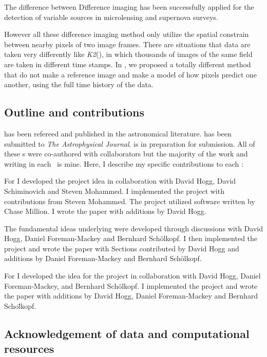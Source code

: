 \documentclass[12pt, preprint]{aastex}
\newcommand{\project}[1]{\textsl{#1}}
\newcommand{\ktwo}{\project{K2}}
\begin{document}
The difference between 
Difference imaging has been successfully applied for the detection of variable sources in microlensing \citep{macho, ogle} and supernova \citep{sdss} surveys.

However all these difference imaging method only utilize the spatial constrain between nearby pixels of two image frames.
There are situations that data are taken very differently like \ktwo(\citep{k2}), in which thousands of images of the same field are taken in different time stamps.
In , we proposed a totally different method that do not make a reference image and make a model of how pixels predict one another, using the full time history of the data.

\subsection{Outline and contributions}
 has been refereed and published in the astronomical literature.
 has been submitted to \emph{The Astrophysical Journal}.
 is in preparation for submission.
All of these \chapname s were co-authored with collaborators but the majority of the work and writing in each \chapname\ is mine.
Here, I describe my specific contributions to each \chapname:
\begin{enumerate}

{\item For   I developed the project idea in collaboration with David Hogg, David Schiminovich and Steven Mohammed.
I implemented the project with contributions from Steven Mohammed.
The project utilized software written by Chase Million.
I wrote the paper with additions by David Hogg.}

{\item The fundamental ideas underlying  were developed through discussions with David Hogg, Daniel Foreman-Mackey and Bernhard Sch\"olkopf.
I then implemented the project and wrote the paper with Sections contributed by David Hogg and additions by Daniel Foreman-Mackey and Bernhard Sch\"olkopf.}

{\item For  I developed the idea for the project in collaboration with David Hogg, Daniel Foreman-Mackey, and Bernhard Sch\"olkopf.
I implemented the project and wrote the paper with additions by David Hogg, Daniel Foreman-Mackey and Bernhard Scho\"lkopf.
}
\end{enumerate}

\subsection{Acknowledgement of data and computational resources}

\clearpage

%
\clearpage
\end{document}
